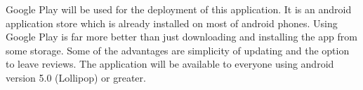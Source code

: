 Google Play will be used for the deployment of this application.
It is an android application store which is already installed on most of android phones.
Using Google Play is far more better than just downloading and installing the app from some storage.
Some of the advantages are simplicity of updating and the option to leave reviews.
The application will be available to everyone using android version 5.0 (Lollipop) or greater.